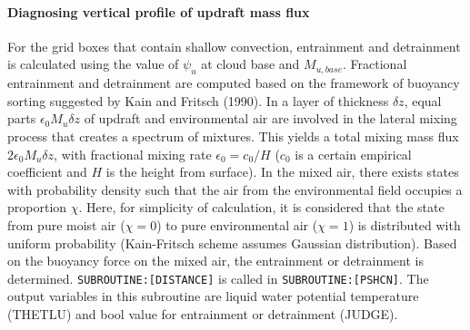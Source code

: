 \paragraph{Diagnosing vertical profile of updraft mass flux}\label{diagnosing-vertical-profile-of-updraft-mass-flux}

For the grid boxes that contain shallow convection, entrainment and detrainment is calculated using the value of $\psi_u$ at cloud base and $M_{u,base}$.
Fractional entrainment and detrainment are computed based on the framework of buoyancy sorting suggested by Kain and Fritsch (1990).
In a layer of thickness $\delta z$, equal parts $\epsilon_0 M_u \delta z$ of updraft and environmental air are involved in the lateral mixing process that creates a spectrum of mixtures.
This yields a total mixing mass flux $2\epsilon_0 M_u \delta z$, with fractional mixing rate $\epsilon_0=c_0/H$ ($c_0$ is a certain empirical coefficient and $H$ is the height from surface).
In the mixed air, there exists states with probability density such that the air from the environmental field occupies a proportion $\chi$. Here, for simplicity of calculation, 
it is considered that the state from pure moist air ($\chi=0$) to pure environmental air ($\chi=1$) is distributed with uniform probability (Kain-Fritsch scheme assumes Gaussian distribution).
Based on the buoyancy force on the mixed air, the entrainment or detrainment is determined. \texttt{SUBROUTINE:[DISTANCE]} is called in \texttt{SUBROUTINE:[PSHCN]}.
The output variables in this subroutine are liquid water potential temperature (THETLU) and bool value for entrainment or detrainment (JUDGE).

